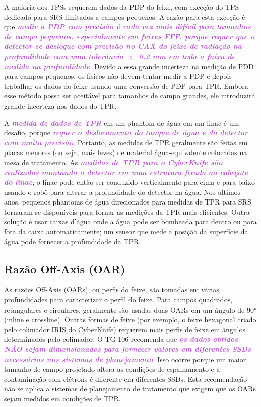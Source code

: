 \documentclass[11pt,a4paper]{article}
\newcounter{exemplo}
\begin{document}
	A maioria dos TPSs requerem dados da PDP do feixe, com exceção do TPS dedicado para SRS limitados a campos pequenos. A razão para esta exceção é que \textcolor{MediumOrchid}{\textbf{\textit{medir a PDP com precisão é cada vez mais difícil para tamanhos de campo pequenos, especialmente em feixes FFF, porque requer que o detector se desloque com precisão no CAX do feixe de radiação na profundidade com uma tolerância $<$ 0.2 mm em toda a faixa de medida na profundidade}}}. Devido a essa grande incerteza na medição de PDD para campos pequenos, os físicos não devem tentar medir a PDP e depois trabalhar os dados do feixe usando uma conversão de PDP para TPR. Embora esse método possa ser aceitável para tamanhos de campo grandes, ele introduzirá grande incerteza nos dados do TPR.

	A \textcolor{MediumOrchid}{\textbf{\textit{medida de dados de TPR}}} em um phantom de água em um linac é um desafio, porque \textcolor{MediumOrchid}{\textbf{\textit{requer o deslocamento do tanque de água e do detector com muita precisão}}}. Portanto, as medidas de TPR geralmente são feitas em placas menores (ou seja, mais leves) de material água-equivalente colocadas na mesa de tratamento. As \textcolor{MediumOrchid}{\textbf{\textit{medidas de TPR para o CyberKnife são realizadas montando o detector em uma estrutura fixada ao cabeçote do linac}}}; o linac pode então ser conduzido verticalmente para cima e para baixo usando o robô para alterar a profundidade do detector na água. Nos últimos anos, pequenos phantoms de água direcionados para medidas de TPR para SRS tornaram-se disponíveis para tornar as medições da TPR mais eficientes. Outra solução é usar caixas d'água onde a água pode ser bombeada para dentro ou para fora da caixa automaticamente; um sensor que mede a posição da superfície da água pode fornecer a profundidade da TPR.

\subsection*{Razão Off-Axis (OAR)}

	As razões Off-Axis (OARs), ou perfis do feixe, são tomadas em várias profundidades para caracterizar o perfil do feixe. Para campos quadrados, retangulares e circulares, geralmente são usadas duas OARs em um ângulo de \ang{90} (inline e crossline). Outras formas de feixe (por exemplo, o feixe hexagonal criado pelo colimador IRIS do CyberKnife) requerem mais perfis de feixe em ângulos determinados pelo colimador. O TG-106 recomenda que \textcolor{MediumOrchid}{\textbf{\textit{os dados obtidos NÃO sejam dimensionados para fornecer valores em diferentes SSDs necessárias nos sistemas de planejamento}}}. Isso ocorre porque um maior tamanho de campo projetado altera as condições de espalhamento e a contaminação com elétrons é diferente em diferentes SSDs. Esta recomendação não se aplica a sistemas de planejamento de tratamento que exigem que os OARs sejam medidos em condições de TPR.
\end{document}
